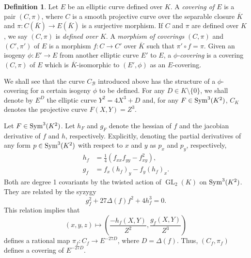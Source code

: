 \documentclass[oneside]{amsart}
\newcommand{\embrace}[3]{\left#1 #3 \right#2}
\newcommand{\lpar}[1]{\embrace{(}{)}{#1}}
\newcommand{\symf}{\textnormal{Sym}^3(K^2)}
\DeclareMathOperator{\gl}{GL}
\theoremstyle{definition}
\newtheorem{definition}[X]{Definition}
\begin{document}
\begin{definition}
    Let $E$ be an elliptic curve defined over $K$. A \textit{covering of $E$} is a pair $(C,\pi)$, where $C$ is a smooth projective curve over the separable closure $\overline{K}$ and $\pi : C(\overline{K})\to E(\overline{K})$ is a surjective morphism. If $C$ and $\pi$ are defined over $K$, we say $(C,\pi)$ is \textit{defined over $K$}. A \textit{morphism of coverings} $(C,\pi)$ and $(C',\pi')$ of $E$ is a morphism $f: C \to C'$ over $\overline{K}$ such that $\pi'\circ f = \pi$. Given an isogeny  $\phi : E' \to E$ from another elliptic curve $E'$ to $E$,  a \textit{$\phi$-covering} is a covering $(C,\pi)$ of $E$ which is $\overline{K}$-isomorphic to $(E',\phi)$ as an $E$-covering.
\end{definition}

We shall see that the curve $C_{\mathcal{B}}$ introduced above has the structure of a $\phi$-covering for a certain isogeny $\phi$ to be defined. For any $D \in K\setminus\{0\}$, we shall denote by $E^D$ the elliptic curve $Y^2 = 4X^3 + D$ and, for any $F \in \symf$, $C_K$ denotes the projective curve $F(X,Y) = Z^3$.

Let $F \in \symf$. Let $h_F$ and $g_F$ denote the hessian of $f$ and the jacobian derivative of $f$ and $h$, respectively. Explicitly, denoting the partial derivatives of any form $p \in \symf$ with respect to $x$ and $y$ as $p_x$ and $p_y$, respectively,  
\begin{align*}
    h_f &= \frac{1}{4}(f_{xx}f_{yy} - f_{xy}^2),\\
    g_f &= f_x(h_f)_y - f_y(h_f)_x.
\end{align*}
Both are degree 1 covariants by the twisted action of $\gl_2(K)$ on $\symf$. They are related by the syzygy
$$
g_f^2 + 27\Delta(f)f^2 + 4h_f^3 = 0.
$$
This relation implies that 
$$
(x,y,z)\mapsto \lpar{\frac{-h_f(X,Y)}{Z^2}, \frac{g_f(X,Y)}{Z^3}}
$$ 
defines a rational map $\pi_f : C_{f}\to E^{-27D}$, where $D = \Delta(f)$. Thus, $(C_{f}, \pi_f)$ defines a covering of $E^{-27D}$.
\end{document}
